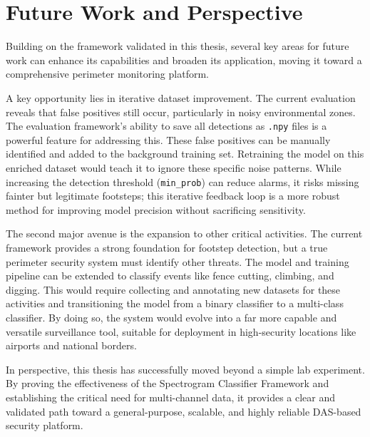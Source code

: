 \section{Future Work and Perspective}
\label{sec:future_work_perspective}

Building on the framework validated in this thesis, several key areas for future work can enhance its capabilities and broaden its application, moving it toward a comprehensive perimeter monitoring platform.

A key opportunity lies in iterative dataset improvement. The current evaluation reveals that false positives still occur, particularly in noisy environmental zones. The evaluation framework's ability to save all detections as \texttt{.npy} files is a powerful feature for addressing this. These false positives can be manually identified and added to the background training set. Retraining the model on this enriched dataset would teach it to ignore these specific noise patterns. While increasing the detection threshold (\texttt{min\_prob}) can reduce alarms, it risks missing fainter but legitimate footsteps; this iterative feedback loop is a more robust method for improving model precision without sacrificing sensitivity.

The second major avenue is the expansion to other critical activities. The current framework provides a strong foundation for footstep detection, but a true perimeter security system must identify other threats. The model and training pipeline can be extended to classify events like fence cutting, climbing, and digging. This would require collecting and annotating new datasets for these activities and transitioning the model from a binary classifier to a multi-class classifier. By doing so, the system would evolve into a far more capable and versatile surveillance tool, suitable for deployment in high-security locations like airports and national borders.

In perspective, this thesis has successfully moved beyond a simple lab experiment. By proving the effectiveness of the Spectrogram Classifier Framework and establishing the critical need for multi-channel data, it provides a clear and validated path toward a general-purpose, scalable, and highly reliable DAS-based security platform.